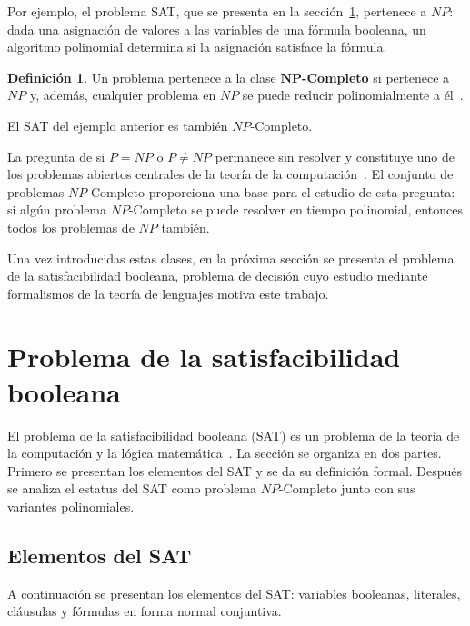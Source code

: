 \documentclass{report}
\theoremstyle{definition}
\newtheorem{definicion}{Definición}[chapter]
\theoremstyle{plain}
\theoremstyle{remark}
\begin{document}
Por ejemplo, el problema SAT, que se presenta en la
sección~\ref{sec:sat}, pertenece a $NP$: dada una asignación de
valores a las variables de una fórmula booleana, un algoritmo
polinomial determina si la asignación satisface la fórmula.

\begin{definicion}
Un problema pertenece a la clase $\boldsymbol{NP}$\textbf{-Completo}
si pertenece a $NP$ y, además, cualquier problema en $NP$ se puede
reducir polinomialmente a él~\cite{hopcroft2006introduction}.
\end{definicion}

El SAT del ejemplo anterior es también $NP$-Completo.

La pregunta de si $P = NP$ o $P \neq NP$ permanece sin resolver y
constituye uno de los problemas abiertos centrales de la teoría de la
computación~\cite{hopcroft2006introduction}. El conjunto de problemas
$NP$-Completo proporciona una base para el estudio de esta pregunta:
si algún problema $NP$-Completo se puede resolver en tiempo
polinomial, entonces todos los problemas de $NP$ también.

Una vez introducidas estas clases, en la próxima sección se presenta
el problema de la satisfacibilidad booleana, problema de decisión cuyo
estudio mediante formalismos de la teoría de lenguajes motiva este
trabajo.

\section{Problema de la satisfacibilidad booleana}
\label{sec:sat}

El problema de la satisfacibilidad booleana (SAT) es un problema de
la teoría de la computación y la lógica
matemática~\cite{hopcroft2006introduction}. La sección se organiza
en dos partes. Primero se presentan los elementos del SAT y se da
su definición formal. Después se analiza el estatus del SAT como
problema $NP$-Completo junto con sus variantes polinomiales.

\subsection{Elementos del SAT}
\label{sec:elementos-sat}

A continuación se presentan los elementos del SAT: variables
booleanas, literales, cláusulas y fórmulas en forma normal conjuntiva.
\end{document}
